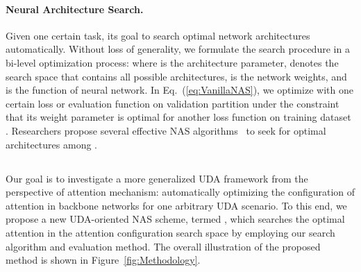 \documentclass[10pt,twocolumn,letterpaper]{article}
\begin{document}
\vspace{-4mm}
\paragraph{Neural Architecture Search.}
Given one certain task, its goal to search optimal network architectures automatically. Without loss of generality, we formulate the search procedure in a bi-level optimization process: 
where  is the architecture parameter,  denotes the search space that contains all possible architectures,  is the network weights, and  is the function of neural network.
In Eq.~(\ref{eq:VanillaNAS}), we optimize  with one certain loss or evaluation function on validation partition  under the constraint that its weight parameter  is optimal for another loss function on training dataset .
Researchers propose several effective NAS algorithms~\cite{real2019EvoNAS,zoph2018NASNet,liu2018DARTS} to seek for optimal architectures  among .











\subsection{\iMethod}
Our goal is to investigate a more generalized UDA framework from the perspective of attention mechanism: automatically optimizing the configuration of attention in backbone networks for one arbitrary UDA scenario. To this end, we propose a new UDA-oriented NAS scheme, termed \iMethod, which searches the optimal attention in the attention configuration search space by employing our search algorithm and evaluation method. The overall illustration of the proposed method is shown in Figure~\ref{fig:Methodology}.
\end{document}
